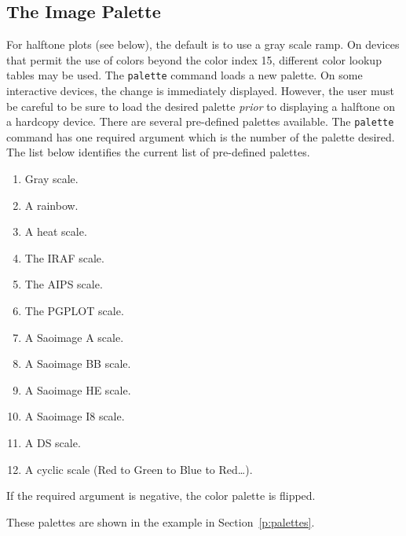 \subsection*		{The Image Palette}

For halftone plots (see below), the default is to use a gray scale ramp.
On devices that permit the use of colors beyond the color index 15,
different color lookup tables may be used.
The
{\tt palette}%
%
command loads a new palette.
On some interactive devices, the change is immediately displayed.
However, the user must be careful to be sure to load the desired palette
{\em prior} to displaying a halftone on a hardcopy device.
There are several pre-defined palettes available.
The {\tt palette} command has one required argument which is the number
of the palette desired.
The list below identifies the current list of pre-defined palettes.
\begin{enumerate}
  \item Gray scale.
  \item A rainbow.
  \item A heat scale.
  \item The IRAF scale.
  \item The AIPS scale.
  \item The PGPLOT scale.
  \item A Saoimage A scale.
  \item A Saoimage BB scale.
  \item A Saoimage HE scale.
  \item A Saoimage I8 scale.
  \item A DS scale.
  \item A cyclic scale (Red to Green to Blue to Red\dots).
\end{enumerate}
If the required argument is negative, the color palette is flipped.
%
\begin{htmlonly}
These palettes are shown in the example in Section~\ref{p:palettes}.
\end{htmlonly}

